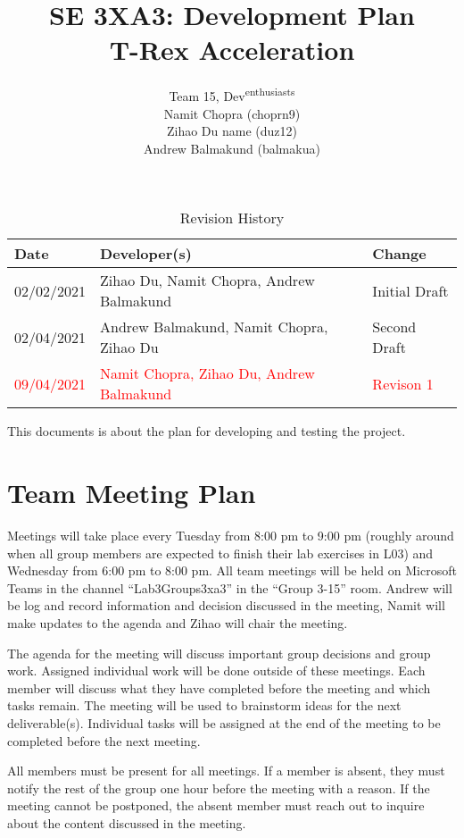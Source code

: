 \documentclass{article}
\title{SE 3XA3: Development Plan\\T-Rex Acceleration}
\author{Team 15, Dev\textsuperscript{enthusiasts}
		\\ Namit Chopra (choprn9)
		\\ Zihao Du name (duz12)
		\\ Andrew Balmakund (balmakua)
}
\date{}
\begin{document}
\begin{table}[hp]
\caption{Revision History} \label{TblRevisionHistory}
\begin{tabularx}{\textwidth}{llX}
\toprule
\textbf{Date} & \textbf{Developer(s)} & \textbf{Change}\\
\midrule
02/02/2021 & Zihao Du, Namit Chopra, Andrew Balmakund & Initial Draft\\
02/04/2021 & Andrew Balmakund, Namit Chopra, Zihao Du & Second Draft\\
\textcolor{red}{09/04/2021} & \textcolor{red}{Namit Chopra, Zihao Du, Andrew Balmakund} & \textcolor{red}{Revison 1}\\
\bottomrule
\end{tabularx}
\end{table}

\newpage

\maketitle

This documents is about the plan for developing and testing the project.

\section{Team Meeting Plan}
Meetings will take place every Tuesday from 8:00 pm to 9:00 pm (roughly around when all group members are expected to finish their lab exercises in L03) and Wednesday from 6:00 pm to 8:00 pm. All team meetings will be held on Microsoft Teams in the channel ``Lab3Groups3xa3'' in the ``Group 3-15'' room. Andrew will be log and record information and decision discussed in the meeting, Namit will make updates to the agenda and Zihao will chair the meeting.

The agenda for the meeting will discuss important group decisions and group work. Assigned individual work will be done outside of these meetings. Each member will discuss what they have completed before the meeting and which tasks remain. The meeting will be used to brainstorm ideas for the next deliverable(s). Individual tasks will be assigned at the end of the meeting to be completed before the next meeting.

All members must be present for all meetings. If a member is absent, they must notify the rest of the group one hour before the meeting with a reason. If the meeting cannot be postponed, the absent member must reach out to inquire about the content discussed in the meeting.
\end{document}
